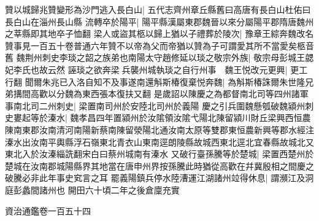 贊以城歸兆贊變形為沙門逃入長白山|{
	五代志齊州章丘縣舊曰高唐有長白山杜佑曰長白山在淄州長山縣}
流轉卒於陽平|{
	陽平縣漢屬東郡魏晉以來分屬陽平郡隋唐魏州之莘縣即其地卒子恤翻}
梁人或盜其柩以歸上猶以子禮葬於陵次|{
	豫章王綜奔魏改名贊事見一百五十卷普通六年贊不以帝為父而帝猶以贊為子可謂愛其所不當愛矣柩音舊}
魏荆州刺史李琰之韶之族弟也南陽太守趙修延以琰之敬宗外族|{
	敬宗母彭城王勰妃李氏也故云然}
誣琰之欲奔梁兵襲州城執琰之自行州事　魏王悦改元更興|{
	更工行翻}
聞爾朱兆已入洛自知不及事遂南還斛斯椿復棄悦奔魏|{
	為斛斯椿誅爾朱世隆兄弟搆間高歡以分魏為東西張本復扶又翻}
是歲詔以陳慶之為都督南北司等四州諸軍事南北司二州刺史|{
	梁置南司州於安陸北司州於義陽}
慶之引兵圍魏懸瓠破魏潁州刺史婁起等於溱水|{
	魏孝昌四年置潁州於汝隂領汝隂弋陽北陳留潁川財丘梁興西恒農陳南東郡汝南清河南陽新蔡南陳留滎陽北通汝南太原等雙郡東恒農新興等郡水經注溱水出汝南平輿縣浮石嶺東北青衣山東南逕朗陵縣故城西東北逕北宜春縣故城北又東北入於汝溱緇詵翻宋白曰蔡州城南有溱水}
又破行臺孫騰等於楚城|{
	梁置西楚州於楚城在汝南郡城陽縣界其地當在唐申州界按孫騰此時猶從高歡在幷冀殷相之間慶之破騰必非此年事史䆒言之耳}
罷義陽鎮兵停水陸漕運江湖諸州竝得休息|{
	謂瀕江及洞庭彭蠡間諸州也}
開田六十頃二年之後倉廩充實

資治通鑑卷一百五十四
